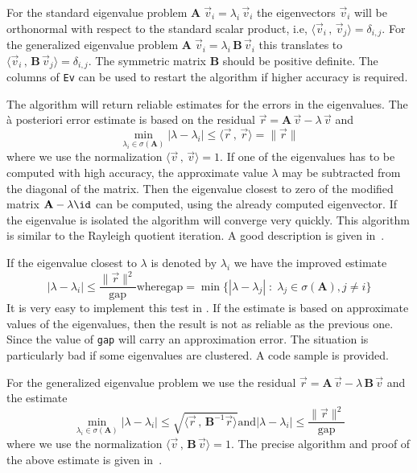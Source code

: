 \documentclass[11pt]{article}
\begin{document}
For the standard eigenvalue problem $\mathbf{A}\;\vec v_i = \lambda_i\, \vec
v_i$ the eigenvectors $\vec v_i$ will be orthonormal with respect to the
standard scalar product, i.e, $\langle \vec v_i\,,\,\vec v_j\rangle
=\delta_{i,j}$. For the generalized eigenvalue problem 
$\mathbf{A}\;\vec v_i = \lambda_i\, \mathbf{B}\,\vec v_i$ this translates to
$\langle \vec v_i\,,\,\mathbf{B}\,\vec v_j\rangle=\delta_{i,j}$. The symmetric
matrix \textbf{B} should be positive definite. The columns of \texttt{Ev} can
be used to restart the algorithm if higher accuracy is required.

The algorithm will return reliable estimates for the errors in the eigenvalues.
The \`a posteriori error estimate is based on the
residual $\vec r = \mathbf{A}\,\vec v -\lambda\,\vec v$ and
\[ \min_{\lambda_i\in\sigma(\mathbf{A})}|\lambda-\lambda_i|\leq 
  \langle \vec r\,,\,\vec r\rangle=\|\vec r\|\]
where we use the normalization $\langle \vec v\,,\,\vec v\rangle =1$.
If one of the eigenvalues has to be computed with high accuracy, the
approximate value $\lambda$ may be subtracted from the diagonal of the matrix.
Then the eigenvalue closest to zero of the modified matrix
$\mathbf{A}-\lambda\id$ can be computed, using the already computed
eigenvector. If the eigenvalue is isolated the algorithm will converge very
quickly. This algorithm is similar to the Rayleigh 
 quotient iteration. A good description is
given in~\cite{GoluVanLoan96}.
\medskip

If the eigenvalue closest to $\lambda$ is denoted by $\lambda_i$ we have
the improved estimate
\[ |\lambda-\lambda_i|\leq  \dfrac{\|\vec r\|^2}{\mbox{gap}}\text{where}
 \mbox{gap}=\min\{|\lambda-\lambda_j|\;:\;
  \lambda_j\in\sigma(\mathbf{A}),j\neq i\} \]
It is very easy to implement this test in \Octave{}. If the estimate is
based on approximate values of the eigenvalues, then the result is not as
reliable as the previous one. Since the value of \texttt{gap} will carry an
approximation error. The situation is particularly bad if some eigenvalues are
clustered. A code  sample is provided.

\bigskip

For the generalized eigenvalue problem 
we use the residual
$\vec r = \mathbf{A}\,\vec v -\lambda\,\mathbf{B}\,\vec v$
and the estimate
\[ \min_{\lambda_i\in\sigma(\mathbf{A})}|\lambda-\lambda_i|\leq 
  \sqrt{\langle \vec r\,,\,\mathbf{B}^{-1}\vec r\rangle}\text{and}
|\lambda-\lambda_i|\leq  \dfrac{\|\vec r\|^2}{\mbox{gap}}\]
where we use the normalization 
$\langle \vec v\,,\,\mathbf{B}\,\vec v\rangle =1$.
The precise algorithm and proof of the above estimate is given
in~\cite{VarFem}.
\end{document}
